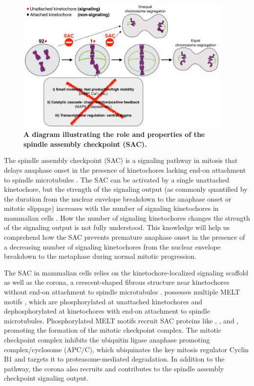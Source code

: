 \begin{figure}
    \centering
    \includegraphics[width=0.95\textwidth]{chapters/figures/SACRole.pdf}
    \caption{\textbf{A diagram illustrating the role and properties of the spindle assembly checkpoint (SAC).}}
    \label{SACRole}
\end{figure}


The spindle assembly checkpoint (SAC) is a signaling pathway in mitosis that delays anaphase onset in the presence of kinetochores lacking end-on attachment to spindle microtubules \cite{LateralAttachmentSAC}. The SAC can be activated by a single unattached kinetochore, but the strength of the signaling output (as commonly quantified by the duration from the nuclear envelope breakdown to the anaphase onset or mitotic slippage) increases with the number of signaling kinetochores in mammalian cells \cite{RiederNormalProgression,Rheostat,Ablation}. How the number of signaling kinetochores changes the strength of the signaling output is not fully understood. This knowledge will help us comprehend how the SAC prevents premature anaphase onset in the presence of a decreasing number of signaling kinetochores from the nuclear envelope breakdown to the metaphase during normal mitotic progression.

The SAC in mammalian cells relies on the kinetochore-localized signaling scaffold  as well as the corona, a crescent-shaped fibrous structure near kinetochores without end-on attachment to spindle microtubules \cite{GSK923295LateralAttachmentEM,CoronaActivatesSAC}.  possesses multiple MELT motifs \cite{MELTEvolution}, which are phosphorylated at unattached kinetochores and dephosphorylated at kinetochores with end-on attachment to spindle microtubules. Phosphorylated MELT motifs recruit SAC proteins like , , and , promoting the formation of the mitotic checkpoint complex. The mitotic checkpoint complex inhibits the ubiquitin ligase anaphase promoting complex/cyclosome (APC/C), which ubiquinates the key mitosis regulator Cyclin B1 and targets it to proteasome-mediated degradation. In addition to the  pathway, the corona also recruits  and contributes to the spindle assembly checkpoint signaling output.

